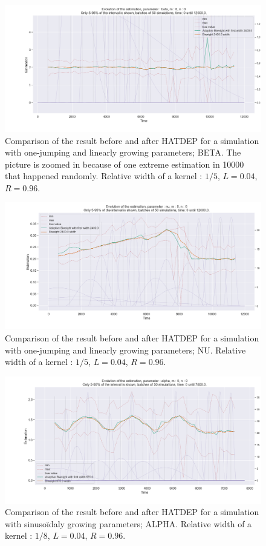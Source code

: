 \begin{figure}
\centering
\includegraphics[width = 0.90 \textwidth]{../imag/chap3/3_bis/Q.png}
\caption{Comparison of the result before and after HATDEP for a simulation with one-jumping and linearly growing parameters; BETA. The picture is zoomed in because of one extreme estimation in 10000 that happened randomly. Relative width of a kernel : $1/5$, $L = 0.04$, $R = 0.96$.}
\label{fig:second_estimate_3_beta}
\end{figure}

\begin{figure}
\centering
\includegraphics[width = 0.90 \textwidth]{../imag/chap3/3_bis/R.png}
\caption{Comparison of the result before and after HATDEP for a simulation with one-jumping and linearly growing parameters; NU. Relative width of a kernel : $1/5$, $L = 0.04$, $R = 0.96$.}
\label{fig:second_estimate_3_nu}
\end{figure}




\begin{figure}
\centering
\includegraphics[width = 0.90 \textwidth]{../imag/chap3/4_bis/P.png}
\caption{Comparison of the result before and after HATDEP for a simulation with sinusoïdaly growing parameters; ALPHA. Relative width of a kernel : $1/8$, $L = 0.04$, $R = 0.96$.}
\label{fig:second_estimate_4_alpha}
\end{figure}

